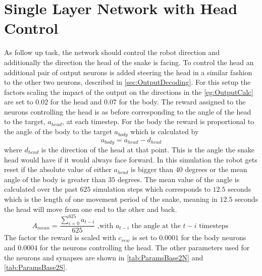 \section{Single Layer Network with Head Control}
As follow up task, the network should control the robot direction and additionally the direction the head of the snake is facing. To control the head an additional pair of output neurons is added steering the head in a similar fashion to the other two neurons, described in \autoref{sec:OutputDecoding}. For this setup the factors scaling the impact of the output on the directions in the \autoref{eg:OutputCalc} are set to 0.02 for the head and $0.07$ for the body.
The reward assigned to the neurons controlling the head is as before corresponding to the angle of the head to the target, $a_{head}$, at each timestep. For the body the reward is proportional to the angle of the body to the target $a_{body}$ which is calculated by
\begin{equation} \label{eq:bodyAngle}
a_{body} = a_{head} - d_{head}
\end{equation}
where $d_{head}$ is the direction of the head at that point. This is the angle the snake head would have if it would always face forward.
In this simulation the robot gets reset if the absolute value of either $a_{head}$ is bigger than $40$ degrees or the mean angle of the body is greater than $35$ degrees.
The mean value of the angle is calculated over the past $625$ simulation steps which corresponds to $12.5$ seconds which is the length of one movement period of the snake, meaning in $12.5$ seconds the head will move from one end to the other and back. 
\begin{equation}
A_{mean} = \frac { \sum_{i=0}^{625} a_{t-i} } {625} \text{ ,with $a_{t-i}$ the angle at the $t-i$ timesteps }
\end{equation}
The factor the reward is scaled with $c_{rew}$ is set to $0.0001$ for the body neurons and $0.0004$ for the neurons controlling the head. The other parameters used for the neurons and synapses are shown in \autoref{tab:ParamsBase2N} and \autoref{tab:ParamsBase2S}.

